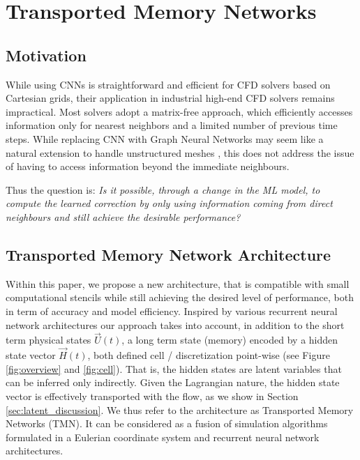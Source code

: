 \section{Transported Memory Networks}

\subsection{Motivation}

While using CNNs is straightforward and efficient for CFD solvers based on Cartesian grids, their application in industrial high-end CFD solvers remains impractical. Most solvers adopt a matrix-free approach, which efficiently accesses information only for nearest neighbors and a limited number of previous time steps. While replacing CNN with Graph Neural Networks may seem like a natural extension to handle unstructured meshes \cite{shankar2023differentiableturbulenceii}, this does not address the issue of having to access information beyond the immediate neighbours. 

Thus the question is: \textit{Is it possible, through a change in the ML model, to compute the learned correction by only using information coming from direct neighbours and still achieve the desirable performance?}

\subsection{Transported Memory Network Architecture}
\label{sec:TMN_arch}

Within this paper, we propose a new architecture, that is compatible with small computational stencils while still achieving the desired level of performance, both in term of accuracy and model efficiency. Inspired by various recurrent neural network architectures \cite{hochreiter1997long, gers2000recurrent, cho2014learning} our approach takes into account, in addition to the short term physical states $\vec{U}(t)$, a long term state (memory) encoded by a hidden state vector $\vec{H}(t)$, both defined cell / discretization point-wise (see Figure \ref{fig:overview} and \ref{fig:cell}). That is, the hidden states are latent variables that can be inferred only indirectly. Given the Lagrangian nature, the hidden state vector is effectively transported with the flow, as we show in Section \ref{sec:latent_discussion}. We thus refer to the architecture as Transported Memory Networks (TMN). It can be considered as a fusion of simulation algorithms formulated in a Eulerian coordinate system and recurrent neural network architectures.

